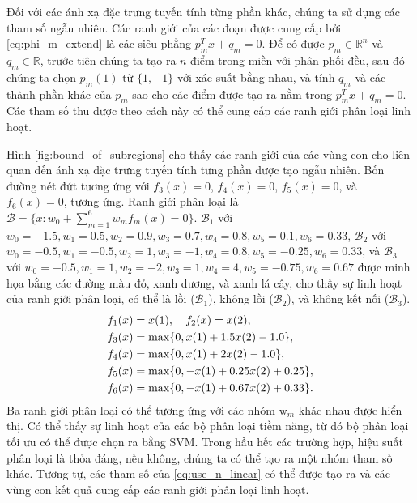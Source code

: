 Đối với các ánh xạ đặc trưng tuyến tính từng phần khác, chúng ta sử dụng các tham số ngẫu nhiên. Các ranh giới của các đoạn được cung cấp bởi \eqref{eq:phi_m_extend} là các siêu phẳng \(p_m^T x + q_m = 0\). Để có được \(p_m \in \mathbb{R}^n\) và \(q_m \in \mathbb{R}\), trước tiên chúng ta tạo ra \(n\) điểm trong miền với phân phối đều, sau đó chúng ta chọn \(p_m(1)\) từ \(\{1, -1\}\) với xác suất bằng nhau, và tính \(q_m\) và các thành phần khác của \(p_m\) sao cho các điểm được tạo ra nằm trong \(p_m^T x + q_m = 0\). Các tham số thu được theo cách này có thể cung cấp các ranh giới phân loại linh hoạt.  

Hình \ref{fig:bound_of_subregions} cho thấy các ranh giới của các vùng con cho liên quan đến ánh xạ đặc trưng tuyến tính tưng phần được tạo ngẫu nhiên. Bốn đường nét đứt tương ứng với \(f_3(x) = 0\), \(f_4(x) = 0\), \(f_5(x) = 0\), và \(f_6(x) = 0\), tương ứng. Ranh giới phân loại là \(\mathcal{B} = \{x : w_0 + \sum_{m=1}^{6} w_m f_m(x) = 0\}\). \(\mathcal{B}_1\) với \(w_0 = -1.5, w_1 = 0.5, w_2 = 0.9, w_3 = 0.7, w_4 = 0.8, w_5 = 0.1, w_6 = 0.33\), \(\mathcal{B}_2\) với \(w_0 = -0.5, w_1 = -0.5, w_2 = 1, w_3 = -1, w_4 = 0.8, w_5 = -0.25, w_6 = 0.33\), và \(\mathcal{B}_3\) với \(w_0 = -0.5, w_1 = 1, w_2 = -2, w_3 = 1, w_4 = 4, w_5 = -0.75, w_6 = 0.67\) được minh họa bằng các đường màu đỏ, xanh dương, và xanh lá cây, cho thấy sự linh hoạt của ranh giới phân loại, có thể là lồi (\(\mathcal{B}_1\)), không lồi (\(\mathcal{B}_2\)), và không kết nối (\(\mathcal{B}_3\)).
\begin{align}
    f_1(x) &= x(1), \quad f_2(x) = x(2), \notag \\
    f_3(x) &= \max\{0, x(1) + 1.5 x(2) - 1.0\}, \notag \\
    f_4(x) &= \max\{0, x(1) + 2 x(2) - 1.0\}, \notag \\
    f_5(x) &= \max\{0, -x(1) + 0.25 x(2) + 0.25\}, \notag \\
    f_6(x) &= \max\{0, -x(1) + 0.67 x(2) + 0.33\}.
    \label{eq:random_subregions}
\end{align}
Ba ranh giới phân loại có thể tương ứng với các nhóm \(\text{w}_m\) khác nhau được hiển thị. Có thể thấy sự linh hoạt của các bộ phân loại tiềm năng, từ đó bộ phân loại tối ưu có thể được chọn ra bằng SVM. Trong hầu hết các trường hợp, hiệu suất phân loại là thỏa đáng, nếu không, chúng ta có thể tạo ra một nhóm tham số khác. Tương tự, các tham số của \eqref{eq:use_n_linear} có thể được tạo ra và các vùng con kết quả cung cấp các ranh giới phân loại linh hoạt.